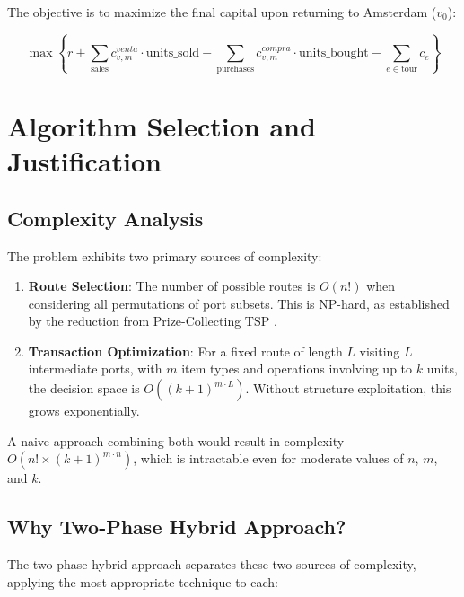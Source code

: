 \documentclass[12pt]{article}
\begin{document}
The objective is to maximize the final capital upon returning to Amsterdam ($v_0$):

$$\max \left\{ r + \sum_{\text{sales}} c_{v,m}^{venta} \cdot \text{units\_sold} - \sum_{\text{purchases}} c_{v,m}^{compra} \cdot \text{units\_bought} - \sum_{e \in \text{tour}} c_e \right\}$$

\section{Algorithm Selection and Justification}
\label{sec:algorithm_selection}

\subsection{Complexity Analysis}

The problem exhibits two primary sources of complexity:

\begin{enumerate}
    \item \textbf{Route Selection}: The number of possible routes is $O(n!)$ when considering all permutations of port subsets. This is NP-hard, as established by the reduction from Prize-Collecting TSP \cite{reduction2025}.
    \item \textbf{Transaction Optimization}: For a fixed route of length $L$ visiting $L$ intermediate ports, with $m$ item types and operations involving up to $k$ units, the decision space is $O((k+1)^{m \cdot L})$. Without structure exploitation, this grows exponentially.
\end{enumerate}

A naive approach combining both would result in complexity $O(n! \times (k+1)^{m \cdot n})$, which is intractable even for moderate values of $n$, $m$, and $k$.

\subsection{Why Two-Phase Hybrid Approach?}

The two-phase hybrid approach separates these two sources of complexity, applying the most appropriate technique to each:
\end{document}
